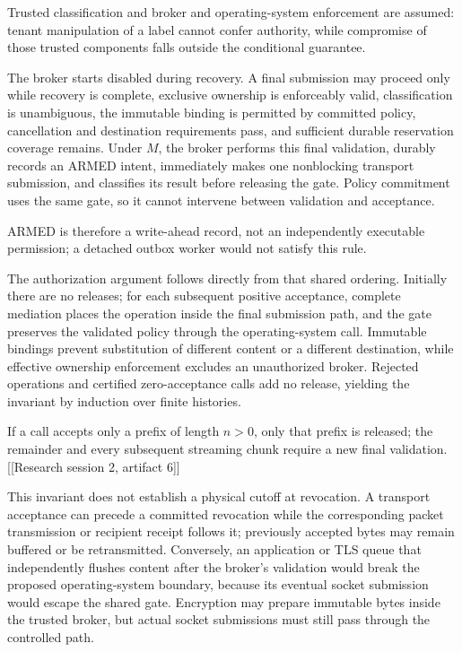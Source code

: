 \documentclass[11pt]{article}
\begin{document}
Trusted classification and broker and operating-system enforcement are assumed: tenant manipulation of a label cannot confer authority, while compromise of those trusted components falls outside the conditional guarantee.

The broker starts disabled during recovery. A final submission may proceed only while recovery is complete, exclusive ownership is enforceably valid, classification is unambiguous, the immutable binding is permitted by committed policy, cancellation and destination requirements pass, and sufficient durable reservation coverage remains. Under $M$, the broker performs this final validation, durably records an ARMED intent, immediately makes one nonblocking transport submission, and classifies its result before releasing the gate. Policy commitment uses the same gate, so it cannot intervene between validation and acceptance.

ARMED is therefore a write-ahead record, not an independently executable permission; a detached outbox worker would not satisfy this rule.

The authorization argument follows directly from that shared ordering. Initially there are no releases; for each subsequent positive acceptance, complete mediation places the operation inside the final submission path, and the gate preserves the validated policy through the operating-system call. Immutable bindings prevent substitution of different content or a different destination, while effective ownership enforcement excludes an unauthorized broker. Rejected operations and certified zero-acceptance calls add no release, yielding the invariant by induction over finite histories.

If a call accepts only a prefix of length $n>0$, only that prefix is released; the remainder and every subsequent streaming chunk require a new final validation. [[Research session 2, artifact 6]]

This invariant does not establish a physical cutoff at revocation. A transport acceptance can precede a committed revocation while the corresponding packet transmission or recipient receipt follows it; previously accepted bytes may remain buffered or be retransmitted. Conversely, an application or TLS queue that independently flushes content after the broker\textquoteright{}s validation would break the proposed operating-system boundary, because its eventual socket submission would escape the shared gate. Encryption may prepare immutable bytes inside the trusted broker, but actual socket submissions must still pass through the controlled path.
\end{document}
